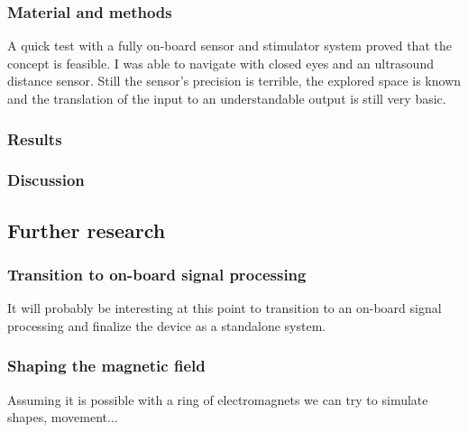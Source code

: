 \documentclass[10pt,journal,compsoc]{IEEEtran}
\begin{document}
		\subsubsection {Material and methods}
		A quick test with a fully on-board sensor and stimulator system proved that the concept is feasible. I was able to navigate with closed eyes and an ultrasound distance sensor. Still the sensor's precision is terrible, the explored space is known and the translation of the input to an understandable output is still very basic.
		
		
		
		
		\subsubsection{Results}
		
		\subsubsection{Discussion}
		
	\subsection{Further research}
		\subsubsection{Transition to on-board signal processing}
		It will probably be interesting at this point to transition to an on-board signal processing and finalize the device as a standalone system.
		\subsubsection{Shaping the magnetic field}
		Assuming it is possible with a ring of electromagnets we can try to simulate shapes, movement...

\end{document}
